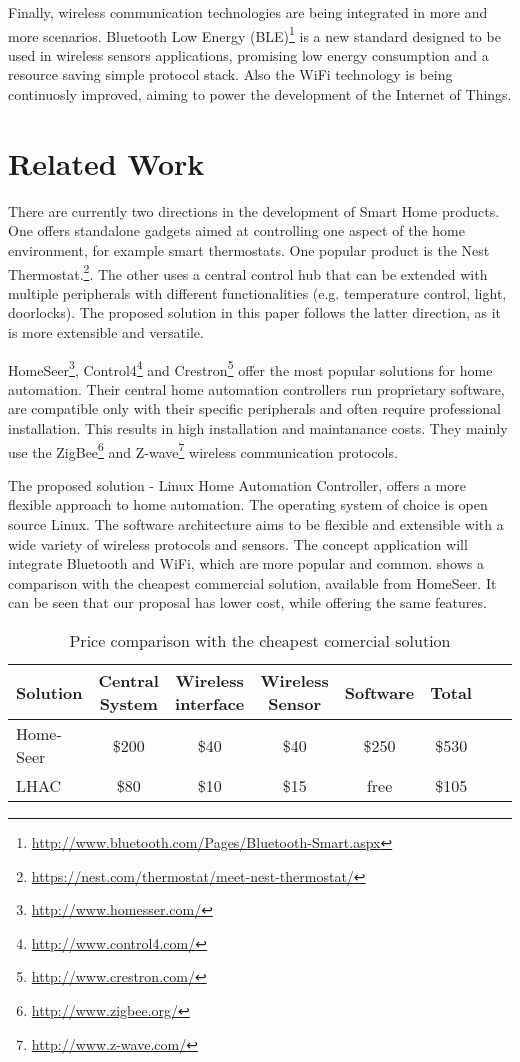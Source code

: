 Finally, wireless communication technologies are being integrated in more and more scenarios. Bluetooth Low Energy (BLE)\footnote{\url{http://www.bluetooth.com/Pages/Bluetooth-Smart.aspx}} is a new standard designed to be used in wireless sensors applications, promising low energy consumption and a resource saving simple protocol stack. Also the WiFi technology is being continuosly improved, aiming to power the development of the Internet of Things.

\section{Related Work}

There are currently two directions in the development of Smart Home products. One offers standalone gadgets aimed at controlling one aspect of the home environment, for example smart thermostats. One popular product is the Nest Thermostat.\footnote{\url{https://nest.com/thermostat/meet-nest-thermostat/}}. The other uses a central control hub that can be extended with multiple peripherals with different functionalities (e.g. temperature control, light, doorlocks). The proposed solution in this paper follows the latter direction, as it is more extensible and versatile.

HomeSeer\footnote{\url{http://www.homesser.com/}}, Control4\footnote{\url{http://www.control4.com/}} and Crestron\footnote{\url{http://www.crestron.com/}} offer the most popular solutions for home automation. Their central home automation controllers run proprietary software, are compatible only with their specific peripherals and often require professional installation. This results in high installation and maintanance costs. They mainly use the ZigBee\footnote{\url{http://www.zigbee.org/}} and Z-wave\footnote{\url{http://www.z-wave.com/}} wireless communication protocols.

The proposed solution - Linux Home Automation Controller, offers a more flexible approach to home automation. The operating system of choice is open source Linux. The software architecture aims to be flexible and extensible with a wide variety of wireless protocols and sensors. The concept application will integrate Bluetooth and WiFi, which are more popular and common.  shows a comparison with the cheapest commercial solution, available from HomeSeer. It can be seen that our proposal has lower cost, while offering the same features.

\begin{center}
\begin{table}[htb]
  \begin{tabular}{l*{6}{c}r}
    Solution & Central System & Wireless interface & Wireless Sensor & Software & Total\\
    \hline
    Home-Seer & \$200 & \$40 & \$40 & \$250 & \$530\\
    LHAC & \$80 & \$10 & \$15 & free & \$105\\
  \end{tabular}
  \caption{Price comparison with the cheapest comercial solution}
  \label{table:price}  
\end{table}
\end{center}


